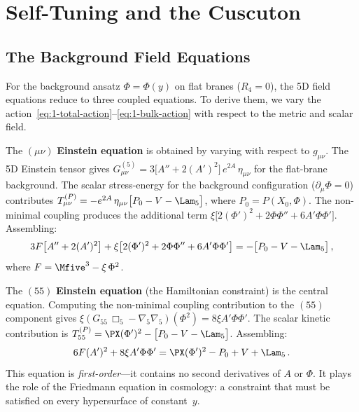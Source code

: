 \section{Self-Tuning and the Cuscuton}
\label{sec:1-cuscuton}

\subsection{The Background Field Equations}
\label{sec:1-field-eqs}

For the background ansatz $\Phi = \Phi(y)$ on flat branes ($R_4 = 0$), the 5D field equations reduce to three coupled equations. To derive them, we vary the action~\eqref{eq:1-total-action}--\eqref{eq:1-bulk-action} with respect to the metric and scalar field.

The $(\mu\nu)$ \textbf{Einstein equation} is obtained by varying with respect to $g_{\mu\nu}$. The 5D Einstein tensor gives $G^{(5)}_{\mu\nu} = 3\bigl[A'' + 2(A')^2\bigr]\, e^{2A}\, \eta_{\mu\nu}$ for the flat-brane background. The scalar stress-energy for the background configuration ($\partial_\mu \Phi = 0$) contributes $T^{(P)}_{\mu\nu} = -e^{2A}\, \eta_{\mu\nu}\bigl[P_0 - V - \Lam_5\bigr]$, where $P_0 = P(X_0, \Phi)$. The non-minimal coupling produces the additional term $\xi\bigl[2(\Phi')^2 + 2\Phi\Phi'' + 6A'\Phi\Phi'\bigr]$. Assembling:
\begin{equation}
\label{eq:1-einstein-munu}
3F\bigl[A'' + 2(A')^2\bigr] + \xi\bigl[2(\Phi')^2 + 2\Phi\Phi'' + 6A'\Phi\Phi'\bigr]
= -\bigl[P_0 - V - \Lam_5\bigr]\,,
\end{equation}
where $F = \Mfive^3 - \xi\,\Phi^2$.

The $(55)$ \textbf{Einstein equation} (the Hamiltonian constraint) is the central equation. Computing the non-minimal coupling contribution to the $(55)$ component gives $\xi(G_{55}\,\Box_5 - \nabla_5\nabla_5)(\Phi^2) = 8\xi A'\Phi\Phi'$. The scalar kinetic contribution is $T^{(P)}_{55} = \PX(\Phi')^2 - \bigl[P_0 - V - \Lam_5\bigr]$. Assembling:
\begin{equation}
\label{eq:1-einstein-55}
6F(A')^2 + 8\xi A'\Phi\Phi' = \PX(\Phi')^2 - P_0 + V + \Lam_5\,.
\end{equation}
This equation is \emph{first-order}---it contains no second derivatives of $A$ or $\Phi$. It plays the role of the Friedmann equation in cosmology: a constraint that must be satisfied on every hypersurface of constant~$y$.

